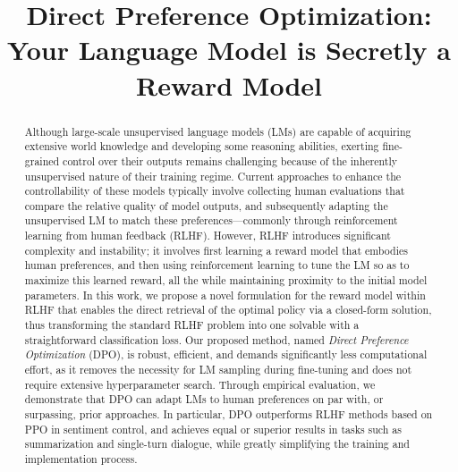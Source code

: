 \title{Direct Preference Optimization: Your Language Model is Secretly a Reward Model}

\begin{abstract}
Although large-scale unsupervised language models (LMs) are capable of acquiring extensive world knowledge and developing some reasoning abilities, exerting fine-grained control over their outputs remains challenging because of the inherently unsupervised nature of their training regime. Current approaches to enhance the controllability of these models typically involve collecting human evaluations that compare the relative quality of model outputs, and subsequently adapting the unsupervised LM to match these preferences—commonly through reinforcement learning from human feedback (RLHF). However, RLHF introduces significant complexity and instability; it involves first learning a reward model that embodies human preferences, and then using reinforcement learning to tune the LM so as to maximize this learned reward, all the while maintaining proximity to the initial model parameters. In this work, we propose a novel formulation for the reward model within RLHF that enables the direct retrieval of the optimal policy via a closed-form solution, thus transforming the standard RLHF problem into one solvable with a straightforward classification loss. Our proposed method, named \textit{Direct Preference Optimization} (DPO), is robust, efficient, and demands significantly less computational effort, as it removes the necessity for LM sampling during fine-tuning and does not require extensive hyperparameter search. Through empirical evaluation, we demonstrate that DPO can adapt LMs to human preferences on par with, or surpassing, prior approaches. In particular, DPO outperforms RLHF methods based on PPO in sentiment control, and achieves equal or superior results in tasks such as summarization and single-turn dialogue, while greatly simplifying the training and implementation process.
\end{abstract}

